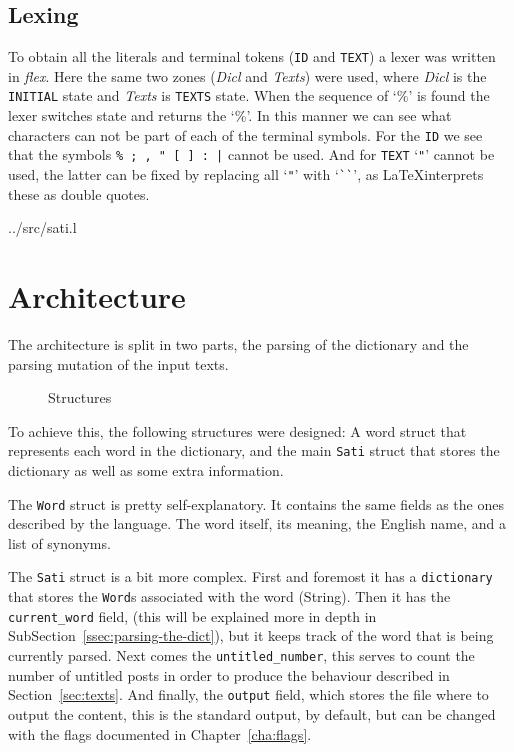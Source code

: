 \documentclass[a4paper]{report}
\begin{document}
\subsection{Lexing}

To obtain all the literals and terminal tokens (\texttt{ID} and \texttt{TEXT})
a lexer was written in \textit{flex}. Here the same two zones (\textit{Dicl}
and \textit{Texts}) were used, where \textit{Dicl} is the \texttt{INITIAL}
state and \textit{Texts} is \texttt{TEXTS} state. When the sequence of `\%' is
found the lexer switches state and returns the `\%'. In this manner we can see
what characters can not be part of each of the terminal symbols. For the
\texttt{ID} we see that the symbols \verb!% ; , " [ ] : |! cannot be used. And
for \texttt{TEXT} `\verb!"!' cannot be used, the latter can be fixed by
replacing all `\verb!"!' with `\verb!``!', as \LaTeX interprets these as double
quotes.


{../src/sati.l}

\section{Architecture}

The architecture is split in two parts, the parsing of the dictionary and the
parsing mutation of the input texts.

\begin{figure}
    \centering
    
    \caption{Structures}
\end{figure}

To achieve this, the following structures were designed: A word struct
that represents each word in the dictionary, and the main \texttt{Sati} struct
that stores the dictionary as well as some extra information.

The \texttt{Word} struct is pretty self-explanatory. It contains the same fields
as the ones described by the language. The word itself, its meaning, the
English name, and a list of synonyms.

The \texttt{Sati} struct is a bit more complex. First and foremost it has a
\texttt{dictionary} that stores the \texttt{Word}s associated with the word
(String). Then it has the \texttt{current\_word} field, (this will be
explained more in depth in SubSection~\ref{ssec:parsing-the-dict}), but it
keeps track of the word that is being currently parsed. Next comes the
\texttt{untitled\_number}, this serves to count the number of untitled posts in
order to produce the behaviour described in Section~\ref{sec:texts}. And
finally, the \texttt{output} field, which stores the file where to output the
content, this is the standard output, by default, but can be changed with the
flags documented in Chapter~\ref{cha:flags}.
\end{document}
